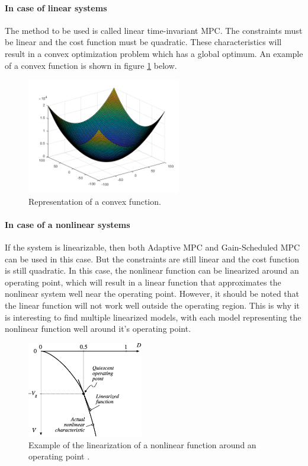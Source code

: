 \documentclass{thesisreport}
\begin{document}
\paragraph{In case of linear systems} The method to be used is called linear time-invariant MPC. The constraints must be linear and the cost function must be quadratic. These characteristics will result in a convex optimization problem \cite{ZEMAN2003325} which has a global optimum. An example of a convex function is shown in figure \ref{convex_function} below.

\begin{figure}[h]
\centering
\includegraphics[width=0.6\textwidth]{Images/Control/MPC_Convex_Equation}
\caption{Representation of a convex function.}
\label{convex_function}
\end{figure}

\paragraph{In case of a nonlinear systems} If the system is linearizable, then both Adaptive MPC and Gain-Scheduled MPC can be used in this case. But the constraints are still linear and the cost function is still quadratic. In this case, the nonlinear function can be linearized around an operating point, which will result in a linear function that approximates the nonlinear system well near the operating point. However, it should be noted that the linear function will not work well outside the operating region. This is why it is interesting to find multiple linearized models, with each model representing the nonlinear function well around it's operating point.



\begin{figure}[h]
\centering
\includegraphics[width=0.45\textwidth]{Images/Control/linearization}
\caption{Example of the linearization of a nonlinear function around an operating point \cite{Erickson2020}.}
\label{nonlinear_function_linearization}
\label{non_convex_function}
\end{figure}
\end{document}
